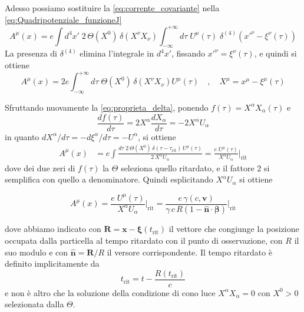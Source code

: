 Adesso possiamo sostituire la \eqref{eq:corrente_covariante} nella \eqref{eq:Quadripotenziale_funzioneJ}
\begin{equation}
    A^\mu(x) = e \int d^4x'\; 2\, \Theta(X^0)\,\delta(X^\nu X_\nu) \int_{-\infty}^{+\infty} d\tau \; U^\mu(\tau)\;\delta^{(4)}\!\left(x'^\nu - \xi^\nu(\tau)\right)
\end{equation}
La presenza di $\delta^{(4)}$ elimina l'integrale in $d^4x'$, fissando $x'^\nu = \xi^\nu(\tau)$, e quindi si ottiene 
\begin{equation}
    A^\mu(x) = 2e \int_{-\infty}^{+\infty} d \tau \; \Theta(X^0)\, \delta\left( X^\nu X_\nu \right) U^\mu(\tau) \quad , \quad X^\mu = x^\mu - \xi^\mu(\tau)
\end{equation}

Sfruttando nuovamente la \eqref{eq:proprieta_delta}, ponendo $f(\tau) = X^\alpha X_\alpha (\tau)$ e 
\begin{equation*}
    \frac{df(\tau)}{d\tau} = 2X^\alpha\frac{dX_\alpha}{d\tau} = - 2 X^\alpha U_\alpha
\end{equation*}
in quanto $dX^\alpha/d\tau = - d\xi^\alpha/d\tau = - U^\alpha$, si ottiene 
\begin{align*}
    A^\mu(x) &= e\int \frac{d\tau \; 2\,\Theta(X^0)\,\delta(\tau-\tau_{\text{rit}})\, U^\mu(\tau)}{2\,X^\alpha U_\alpha} = \frac{e \; U^\mu(\tau)}{X^\alpha U_\alpha} \Bigg|_{\text{rit}}
\end{align*} 
dove dei due zeri di $f(\tau)$ la $\Theta$ seleziona quello ritardato, e il fattore $2$ si semplifica con quello a denominatore. Quindi esplicitando $X^\alpha U_\alpha$ si ottiene
\begin{tcolorbox}[colback=black!5!white, colframe=black!45!white, boxrule=0.8pt]
\begin{equation}
    A^\mu(x) = \frac{e \; U^\mu(\tau)}{X^\alpha U_\alpha} \Bigg|_{\text{rit}} = \frac{e\, \gamma(c, \mathbf{v})}{\gamma\, c\, R\left(1-\hat{\mathbf{n}} \cdot \boldsymbol{\beta}\right)} \Bigg|_{\text{rit}}
\end{equation}
\end{tcolorbox}
dove abbiamo indicato con $\mathbf{R} = \mathbf{x} - \boldsymbol{\xi}(t_{\text{rit}})$ il vettore che congiunge la posizione occupata dalla particella al tempo ritardato con il punto di osservazione, con $R$ il suo modulo e con $\hat{\mathbf{n}} = \mathbf{R}/R$ il versore corrispondente. Il tempo ritardato è definito implicitamente da
\begin{equation}
    t_{\text{rit}} = t - \frac{R(t_{\text{rit}})}{c}
    \label{eq:tempo_ritardato}
\end{equation}
e non è altro che la soluzione della condizione di cono luce $X^\alpha X_\alpha = 0$ con $X^0 > 0$ selezionata dalla $\Theta$.

